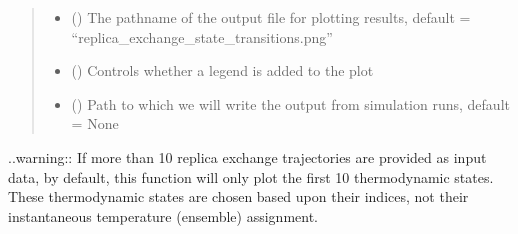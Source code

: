 \documentclass[letterpaper,12pt,english,openany,oneside]{sphinxmanual}
\begin{document}
\begin{fulllineitems}
\begin{quote}
\begin{description}
\begin{itemize}
\item {} 
 () \textendash{} The pathname of the output file for plotting results, default = “replica\_exchange\_state\_transitions.png”

\item {} 
 () \textendash{} Controls whether a legend is added to the plot

\item {} 
 () \textendash{} Path to which we will write the output from simulation runs, default = None

\end{itemize}

\end{description}\end{quote}

..warning:: If more than 10 replica exchange trajectories are provided as input data, by default, this function will only plot the first 10 thermodynamic states.  These thermodynamic states are chosen based upon their indices, not their instantaneous temperature (ensemble) assignment.

\end{fulllineitems}

\label{\detokenize{simulation:module-simulation.tools}}
\end{document}
